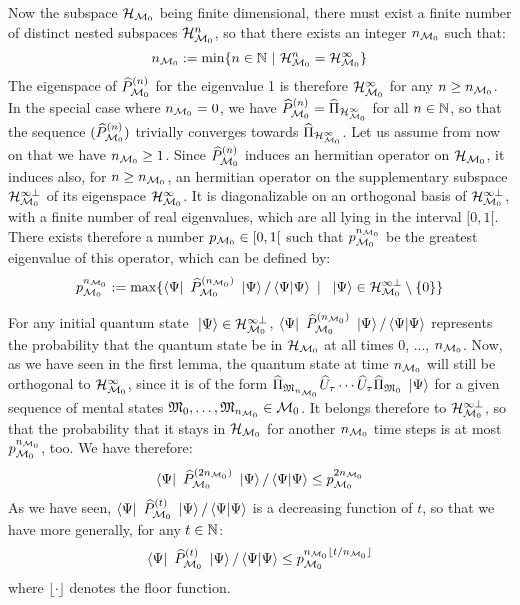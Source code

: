  Now the subspace $\mathcal H_{\mathcal M_0}$ being finite dimensional, there must exist a finite number of distinct nested subspaces $\mathcal H_{\mathcal M_0}^n$, so that there exists an integer $n_{\mathcal M_0}$ such that:
\begin{equation*}
n_{\mathcal M_0} := \min \{ n \in \mathbb{N}\ |\ \mathcal H_{\mathcal M_0}^n = \mathcal H_{\mathcal M_0}^\infty \}
\end{equation*}
The eigenspace of $\widehat{P}_{\mathcal M_0}^{(n)}$ for the eigenvalue 1 is therefore $\mathcal H_{\mathcal M_0}^\infty$ for any $n \geq n_{\mathcal M_0}$. In the special case where $n_{\mathcal M_0} = 0$, we have $\widehat{P}_{\mathcal M_0}^{(n)} = \widehat{\Pi}_{\mathcal H_{\mathcal M_0}^\infty}$ for all $n \in \mathbb{N}$, so that the sequence $(\widehat{P}_{\mathcal M_0}^{(n)})$ trivially converges towards $\widehat{\Pi}_{\mathcal H_{\mathcal M_0}^\infty}$. Let us assume from now on that we have $n_{\mathcal M_0} \geq 1$. Since $\widehat{P}_{\mathcal M_0}^{(n)}$ induces an hermitian operator on $\mathcal H_{\mathcal M_0}$, it induces also, for $n \geq n_{\mathcal M_0}$, an hermitian operator on the supplementary subspace $\mathcal H_{\mathcal M_0}^{\infty \perp}$ of its eigenspace $\mathcal H_{\mathcal M_0}^\infty$. It is diagonalizable on an orthogonal basis of $\mathcal H_{\mathcal M_0}^{\infty \perp}$, with a finite number of real eigenvalues, which are all lying in the interval $[0, 1[$. There exists therefore a number $p_{\mathcal M_0} \in [0, 1[$ such that $p_{\mathcal M_0}^{n_{\mathcal M_0}}$ be the greatest eigenvalue of this operator, which can be defined by:
\begin{equation*}
p_{\mathcal M_0}^{n_{\mathcal M_0}} := \max \{ \left\langle{\Psi}\right|\  \widehat{P}_{\mathcal M_0}^{(n_{\mathcal M_0})} \ \left|{\Psi}\right\rangle / \left\langle{\Psi}|{\Psi}\right\rangle \ |\ \ \left|{\Psi}\right\rangle \in \mathcal H_{\mathcal M_0}^{\infty \perp} \setminus \{ 0 \} \}
\end{equation*}

 For any initial quantum state $\ \left|{\Psi}\right\rangle \in \mathcal H_{\mathcal M_0}^{\infty \perp}$, $\left\langle{\Psi}\right|\  \widehat{P}_{\mathcal M_0}^{(n_{\mathcal M_0})} \ \left|{\Psi}\right\rangle / \left\langle{\Psi}|{\Psi}\right\rangle$ represents the probability that the quantum state be in $\mathcal H_{\mathcal M_0}$ at all times 0, ..., $n_{\mathcal M_0}$. Now, as we have seen in the first lemma, the quantum state at time $n_{\mathcal M_0}$ will still be orthogonal to $\mathcal H_{\mathcal M_0}^\infty$, since it is of the form $\widehat{\Pi}_{\mathfrak{M}_{n_{\mathcal M_0}}} \widehat{U}_\tau \dotsm \widehat{U}_\tau \widehat{\Pi}_{\mathfrak{M}_0} \ \left|{\Psi}\right\rangle$ for a given sequence of mental states $\mathfrak{M}_0, \dotsc, \mathfrak{M}_{n_{\mathcal M_0}} \in \mathcal M_0$. It belongs therefore to $\mathcal H_{\mathcal M_0}^{\infty \perp}$, so that the probability that it stays in $\mathcal H_{\mathcal M_0}$ for another $n_{\mathcal M_0}$ time steps is at most $p_{\mathcal M_0}^{n_{\mathcal M_0}}$, too. We have therefore:
\begin{equation*}
\left\langle{\Psi}\right|\  \widehat{P}_{\mathcal M_0}^{(2 n_{\mathcal M_0})} \ \left|{\Psi}\right\rangle / \left\langle{\Psi}|{\Psi}\right\rangle \leq p_{\mathcal M_0}^{2 n_{\mathcal M_0}}
\end{equation*}
As we have seen, $\left\langle{\Psi}\right|\  \widehat{P}_{\mathcal M_0}^{(t)} \ \left|{\Psi}\right\rangle / \left\langle{\Psi}|{\Psi}\right\rangle$ is a decreasing function of $t$, so that we have more generally, for any $t \in \mathbb{N}$:
\begin{equation*}
\left\langle{\Psi}\right|\  \widehat{P}_{\mathcal M_0}^{(t)} \ \left|{\Psi}\right\rangle / \left\langle{\Psi}|{\Psi}\right\rangle \leq p_{\mathcal M_0}^{n_{\mathcal M_0} \lfloor t / n_{\mathcal M_0} \rfloor}
\end{equation*}
where $\lfloor \cdot \rfloor$ denotes the floor function.

